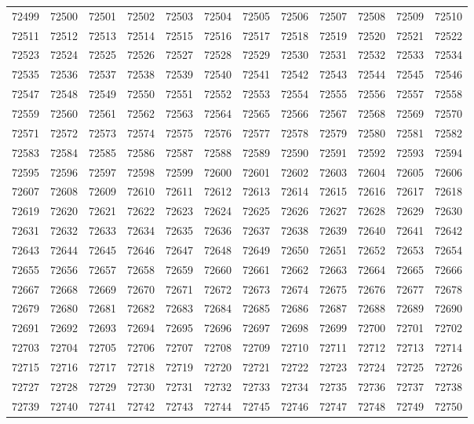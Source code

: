 \begin{center}
\begin{longtable}{llllllllllll}
72499 &72500 &72501 &72502 &72503 &72504 &72505 &72506 &72507 &72508 &72509 &72510 \\
72511 &72512 &72513 &72514 &72515 &72516 &72517 &72518 &72519 &72520 &72521 &72522 \\
72523 &72524 &72525 &72526 &72527 &72528 &72529 &72530 &72531 &72532 &72533 &72534 \\
72535 &72536 &72537 &72538 &72539 &72540 &72541 &72542 &72543 &72544 &72545 &72546 \\
72547 &72548 &72549 &72550 &72551 &72552 &72553 &72554 &72555 &72556 &72557 &72558 \\
72559 &72560 &72561 &72562 &72563 &72564 &72565 &72566 &72567 &72568 &72569 &72570 \\
72571 &72572 &72573 &72574 &72575 &72576 &72577 &72578 &72579 &72580 &72581 &72582 \\
72583 &72584 &72585 &72586 &72587 &72588 &72589 &72590 &72591 &72592 &72593 &72594 \\
72595 &72596 &72597 &72598 &72599 &72600 &72601 &72602 &72603 &72604 &72605 &72606 \\
72607 &72608 &72609 &72610 &72611 &72612 &72613 &72614 &72615 &72616 &72617 &72618 \\
72619 &72620 &72621 &72622 &72623 &72624 &72625 &72626 &72627 &72628 &72629 &72630 \\
72631 &72632 &72633 &72634 &72635 &72636 &72637 &72638 &72639 &72640 &72641 &72642 \\
72643 &72644 &72645 &72646 &72647 &72648 &72649 &72650 &72651 &72652 &72653 &72654 \\
72655 &72656 &72657 &72658 &72659 &72660 &72661 &72662 &72663 &72664 &72665 &72666 \\
72667 &72668 &72669 &72670 &72671 &72672 &72673 &72674 &72675 &72676 &72677 &72678 \\
72679 &72680 &72681 &72682 &72683 &72684 &72685 &72686 &72687 &72688 &72689 &72690 \\
72691 &72692 &72693 &72694 &72695 &72696 &72697 &72698 &72699 &72700 &72701 &72702 \\
72703 &72704 &72705 &72706 &72707 &72708 &72709 &72710 &72711 &72712 &72713 &72714 \\
72715 &72716 &72717 &72718 &72719 &72720 &72721 &72722 &72723 &72724 &72725 &72726 \\
72727 &72728 &72729 &72730 &72731 &72732 &72733 &72734 &72735 &72736 &72737 &72738 \\
72739 &72740 &72741 &72742 &72743 &72744 &72745 &72746 &72747 &72748 &72749 &72750 \\

\end{longtable}
\end{center}
